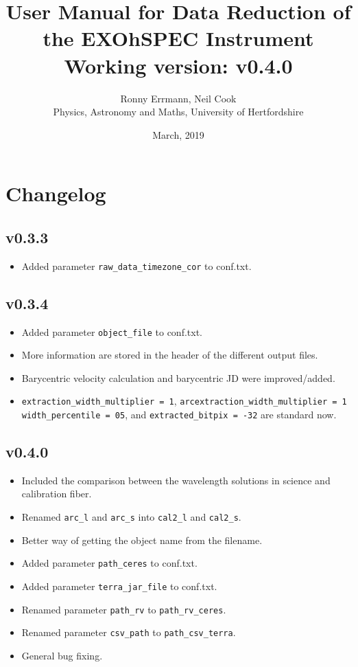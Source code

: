 \documentclass[10pt,a4paper]{article}
\title{User Manual for Data Reduction of the EXOhSPEC Instrument \\ Working version: v0.4.0}
\date{March, 2019}
\author{Ronny Errmann, Neil Cook\\ Physics, Astronomy and Maths, University of Hertfordshire}
\begin{document}
\maketitle

\tableofcontents
{}


\section{Changelog}
\subsection*{v0.3.3}
\begin{itemize}\setlength\itemsep{0em}
 \item Added parameter \verb|raw_data_timezone_cor| to conf.txt.
\end{itemize}

\subsection*{v0.3.4}
\begin{itemize}\setlength\itemsep{0em}
 \item Added parameter \verb|object_file| to conf.txt.
 \item More information are stored in the header of the different output files.
 \item Barycentric velocity calculation and barycentric JD were improved/added.
 \item \verb|extraction_width_multiplier = 1|, \verb|arcextraction_width_multiplier = 1| \verb|width_percentile = 05|, and \verb|extracted_bitpix = -32| are standard now.
\end{itemize}

\subsection*{v0.4.0}
\begin{itemize}\setlength\itemsep{0em}
  \item Included the comparison between the wavelength solutions in science and calibration fiber.
  \item Renamed \verb|arc_l| and \verb|arc_s| into \verb|cal2_l| and \verb|cal2_s|.
  \item Better way of getting the object name from the filename.
  \item Added parameter \verb|path_ceres| to conf.txt.
  \item Added parameter \verb|terra_jar_file| to conf.txt.
  \item Renamed parameter \verb|path_rv| to \verb|path_rv_ceres|.
  \item Renamed parameter \verb|csv_path| to \verb|path_csv_terra|.
  \item General bug fixing.
\end{itemize}
\end{document}
